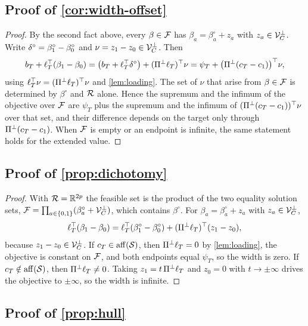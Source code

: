 \subsection{Proof of \texorpdfstring{\cref{cor:width-offset}}{Corollary 1}}
\label{app:proof-width-offset}

\begin{proof}
By the second fact above, every $\beta\in\mathcal F$ has
$\beta_a=\beta_a^\circ+z_a$ with $z_a\in\mathcal V_C^\perp$. Write
$\delta^\circ=\beta_1^\circ-\beta_0^\circ$ and $\nu=z_1-z_0\in\mathcal V_C^\perp$.
Then
\[
  b_T+\ell_T^\top(\beta_1-\beta_0)
  =\bigl(b_T+\ell_T^\top\delta^\circ\bigr)+(\Pi^\perp\ell_T)^\top\nu
  =\psi_T+\bigl(\Pi^\perp(c_T-c_1)\bigr)^\top\nu,
\]
using $\ell_T^\top\nu=(\Pi^\perp\ell_T)^\top\nu$ and \cref{lem:loading}.
The set of $\nu$ that arise from $\beta\in\mathcal F$ is determined by
$\beta^\circ$ and $\mathcal R$ alone. Hence the supremum and the infimum of
the objective over $\mathcal F$ are $\psi_T$ plus the supremum and the
infimum of $(\Pi^\perp(c_T-c_1))^\top\nu$ over that set, and their
difference depends on the target only through $\Pi^\perp(c_T-c_1)$. When
$\mathcal F$ is empty or an endpoint is infinite, the same statement holds
for the extended value.
\end{proof}

\subsection{Proof of \texorpdfstring{\cref{prop:dichotomy}}{Proposition 1}}
\label{app:proof-dichotomy}

\begin{proof}
With $\mathcal R=\mathbb{R}^{2p}$ the feasible set is the product of the two
equality solution sets, $\mathcal F=\prod_{a\in\{0,1\}}
(\beta^\circ_a+\mathcal V_C^\perp)$, which contains $\beta^\circ$. For
$\beta_a=\beta^\circ_a+z_a$ with $z_a\in\mathcal V_C^\perp$,
\[
  \ell_T^\top(\beta_1-\beta_0)
  =\ell_T^\top(\beta^\circ_1-\beta^\circ_0)
  +(\Pi^\perp\ell_T)^\top(z_1-z_0),
\]
because $z_1-z_0\in\mathcal V_C^\perp$. If $c_T\in\operatorname{aff}(\mathcal S)$, then
$\Pi^\perp\ell_T=0$ by \cref{lem:loading}, the objective is constant on
$\mathcal F$, and both endpoints equal $\psi_T$, so the width is zero. If
$c_T\notin\operatorname{aff}(\mathcal S)$, then $\Pi^\perp\ell_T\neq0$. Taking
$z_1=t\,\Pi^\perp\ell_T$ and $z_0=0$ with $t\to\pm\infty$ drives the
objective to $\pm\infty$, so the width is infinite.
\end{proof}

\subsection{Proof of \texorpdfstring{\cref{prop:hull}}{Proposition 2}}
\label{app:proof-hull}

